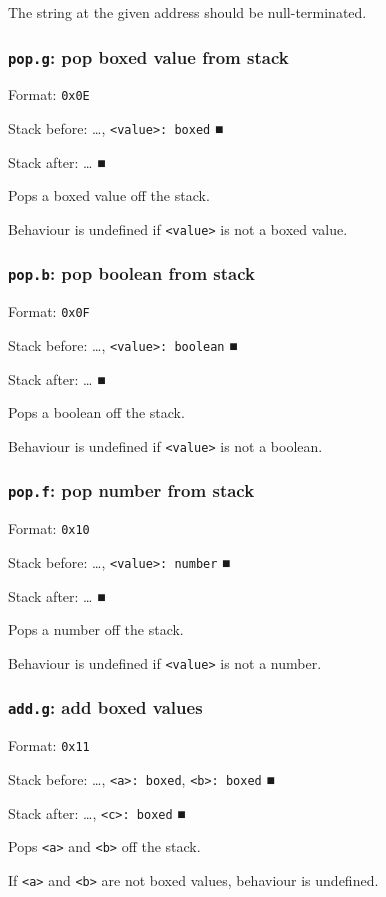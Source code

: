 The string at the given address should be null-terminated.

\subsubsection{\texttt{pop.g}: pop boxed value from stack}
\label{sec:org5cb332a}
Format: \texttt{0x0E}

Stack before: \ldots{}​, \texttt{<value>: boxed} ■

Stack after: \ldots{}​ ■

Pops a boxed value off the stack.

Behaviour is undefined if \texttt{<value>} is not a boxed value.

\subsubsection{\texttt{pop.b}: pop boolean from stack}
\label{sec:org55a65aa}
Format: \texttt{0x0F}

Stack before: \ldots{}​, \texttt{<value>: boolean} ■

Stack after: \ldots{}​ ■

Pops a boolean off the stack.

Behaviour is undefined if \texttt{<value>} is not a boolean.

\subsubsection{\texttt{pop.f}: pop number from stack}
\label{sec:orgf652769}
Format: \texttt{0x10}

Stack before: \ldots{}​, \texttt{<value>: number} ■

Stack after: \ldots{}​ ■

Pops a number off the stack.

Behaviour is undefined if \texttt{<value>} is not a number.

\subsubsection{\texttt{add.g}: add boxed values}
\label{sec:orgd3666a0}
Format: \texttt{0x11}

Stack before: \ldots{}​, \texttt{<a>: boxed}, \texttt{<b>: boxed} ■

Stack after: \ldots{}​, \texttt{<c>: boxed} ■

Pops \texttt{<a>} and \texttt{<b>} off the stack.

If \texttt{<a>} and \texttt{<b>} are not boxed values, behaviour is undefined.

